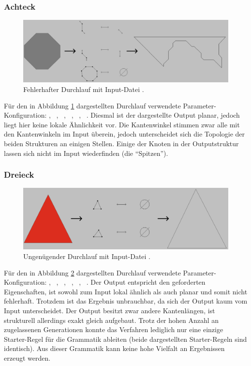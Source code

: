 \subsubsection{Achteck}
\begin{figure}[H]
    \centering
    \includegraphics[width=\textwidth]{images/octagon_fail.png}
    \caption{Fehlerhafter Durchlauf mit Input-Datei .}
    \label{fig:octagon_fail}
\end{figure}
Für den in Abbildung \ref{fig:octagon_fail} dargestellten Durchlauf verwendete Parameter-Konfiguration: , \ , \ ,
\ , \ , \ . Diesmal ist der dargestellte Output planar, jedoch liegt hier keine lokale Ähnlichkeit
vor. Die Kantenwinkel stimmen zwar alle mit den Kantenwinkeln im Input überein, jedoch unterscheidet sich die Topologie der beiden Strukturen an einigen Stellen.
Einige der Knoten in der Outputstruktur lassen sich nicht im Input wiederfinden (die ``Spitzen'').

\subsubsection{Dreieck}
\begin{figure}[H]  
    \centering  
    \includegraphics[width=\textwidth]{images/triangle_fail.png}
    \caption{Ungenügender Durchlauf mit Input-Datei .}
    \label{fig:triangle_fail}
\end{figure}
Für den in Abbildung \ref{fig:triangle_fail} dargestellten Durchlauf verwendete Parameter-Konfiguration: , \ , \ ,
\ , \ , \ . Der Output entspricht den geforderten Eigenschaften, ist sowohl zum Input lokal
ähnlich als auch planar und somit nicht fehlerhaft. Trotzdem ist das Ergebnis unbrauchbar, da sich der Output kaum vom Input unterscheidet. Der Output
besitzt zwar andere Kantenlängen, ist strukturell allerdings exakt gleich aufgebaut. Trotz der hohen Anzahl an zugelassenen Generationen konnte das Verfahren
lediglich nur eine einzige Starter-Regel für die Grammatik ableiten (beide dargestellten Starter-Regeln sind identisch). Aus dieser Grammatik kann keine
hohe Vielfalt an Ergebnissen erzeugt werden.

